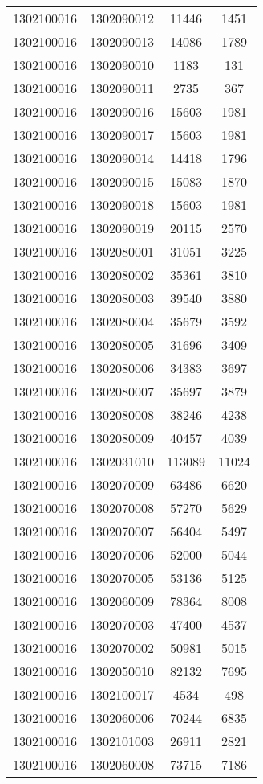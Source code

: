 \begin{longtable}{llcc}
1302100016 & 1302090012 & 11446 & 1451\\
1302100016 & 1302090013 & 14086 & 1789\\
1302100016 & 1302090010 & 1183 & 131\\
1302100016 & 1302090011 & 2735 & 367\\
1302100016 & 1302090016 & 15603 & 1981\\
1302100016 & 1302090017 & 15603 & 1981\\
1302100016 & 1302090014 & 14418 & 1796\\
1302100016 & 1302090015 & 15083 & 1870\\
1302100016 & 1302090018 & 15603 & 1981\\
1302100016 & 1302090019 & 20115 & 2570\\
1302100016 & 1302080001 & 31051 & 3225\\
1302100016 & 1302080002 & 35361 & 3810\\
1302100016 & 1302080003 & 39540 & 3880\\
1302100016 & 1302080004 & 35679 & 3592\\
1302100016 & 1302080005 & 31696 & 3409\\
1302100016 & 1302080006 & 34383 & 3697\\
1302100016 & 1302080007 & 35697 & 3879\\
1302100016 & 1302080008 & 38246 & 4238\\
1302100016 & 1302080009 & 40457 & 4039\\
1302100016 & 1302031010 & 113089 & 11024\\
1302100016 & 1302070009 & 63486 & 6620\\
1302100016 & 1302070008 & 57270 & 5629\\
1302100016 & 1302070007 & 56404 & 5497\\
1302100016 & 1302070006 & 52000 & 5044\\
1302100016 & 1302070005 & 53136 & 5125\\
1302100016 & 1302060009 & 78364 & 8008\\
1302100016 & 1302070003 & 47400 & 4537\\
1302100016 & 1302070002 & 50981 & 5015\\
1302100016 & 1302050010 & 82132 & 7695\\
1302100016 & 1302100017 & 4534 & 498\\
1302100016 & 1302060006 & 70244 & 6835\\
1302100016 & 1302101003 & 26911 & 2821\\
1302100016 & 1302060008 & 73715 & 7186\\

\end{longtable}
